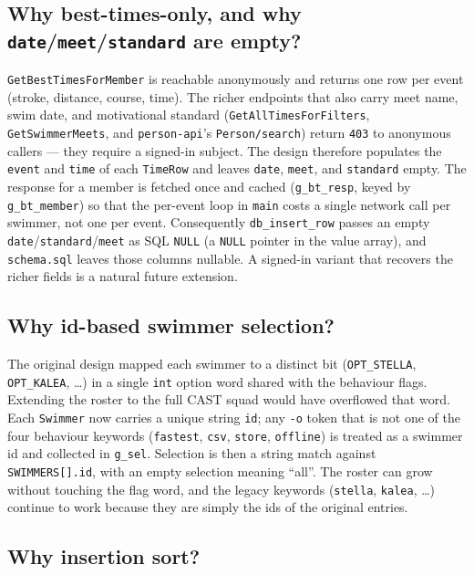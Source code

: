 \documentclass[12pt]{article}
\newcommand{\code}[1]{\texttt{#1}}
\begin{document}
\begin{description}[style=nextline]
\subsection{Why best-times-only, and why \code{date}/\code{meet}/\code{standard} are empty?}
\label{sec:why-bestonly}

\code{GetBestTimesForMember} is reachable anonymously and returns one
row per event (stroke, distance, course, time).  The richer endpoints
that also carry meet name, swim date, and motivational standard
(\code{GetAllTimesForFilters}, \code{GetSwimmerMeets}, and
\code{person-api}'s \code{Person/search}) return \code{403} to
anonymous callers --- they require a signed-in subject.  The design
therefore populates the \code{event} and \code{time} of each
\code{TimeRow} and leaves \code{date}, \code{meet}, and
\code{standard} empty.  The response for a member is fetched once and
cached (\code{g\_bt\_resp}, keyed by \code{g\_bt\_member}) so that the
per-event loop in \code{main} costs a single network call per swimmer,
not one per event.  Consequently \code{db\_insert\_row} passes an
empty \code{date}/\code{standard}/\code{meet} as SQL \code{NULL} (a
\code{NULL} pointer in the value array), and \code{schema.sql} leaves
those columns nullable.  A signed-in variant that recovers the richer
fields is a natural future extension.

\subsection{Why id-based swimmer selection?}
\label{sec:why-ids}

The original design mapped each swimmer to a distinct bit
(\code{OPT\_STELLA}, \code{OPT\_KALEA}, \dots) in a single \code{int}
option word shared with the behaviour flags.  Extending the roster to
the full CAST squad would have overflowed that word.  Each
\code{Swimmer} now carries a unique string \code{id}; any \code{-o}
token that is not one of the four behaviour keywords (\code{fastest},
\code{csv}, \code{store}, \code{offline}) is treated as a swimmer id
and collected in \code{g\_sel}.  Selection is then a string match
against \code{SWIMMERS[].id}, with an empty selection meaning ``all''.
The roster can grow without touching the flag word, and the legacy
keywords (\code{stella}, \code{kalea}, \dots) continue to work because
they are simply the ids of the original entries.

\subsection{Why insertion sort?}


\end{description}
\end{document}
